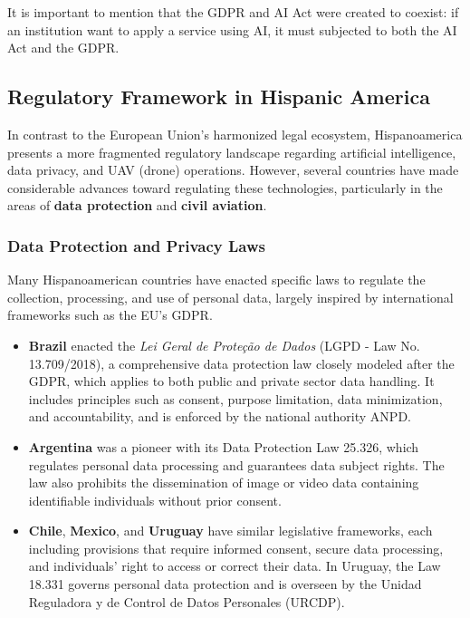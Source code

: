\documentclass[12pt]{report} %
\begin{document}
It is important to mention that the GDPR and AI Act were created to coexist: if an institution want to apply a service using AI, it must subjected to both the AI Act and the GDPR. 

\subsection{Regulatory Framework in Hispanic America}

In contrast to the European Union’s harmonized legal ecosystem, Hispanoamerica presents a more fragmented regulatory landscape regarding artificial intelligence, data privacy, and UAV (drone) operations. However, several countries have made considerable advances toward regulating these technologies, particularly in the areas of \textbf{data protection} and \textbf{civil aviation}.

\subsubsection{Data Protection and Privacy Laws}

Many Hispanoamerican countries have enacted specific laws to regulate the collection, processing, and use of personal data, largely inspired by international frameworks such as the EU's GDPR. 

\begin{itemize}
    \item \textbf{Brazil} enacted the \textit{Lei Geral de Proteção de Dados} (LGPD - Law No. 13.709/2018), a comprehensive data protection law closely modeled after the GDPR, which applies to both public and private sector data handling. It includes principles such as consent, purpose limitation, data minimization, and accountability, and is enforced by the national authority ANPD.
    
    \item \textbf{Argentina} was a pioneer with its Data Protection Law 25.326, which regulates personal data processing and guarantees data subject rights. The law also prohibits the dissemination of image or video data containing identifiable individuals without prior consent.
    
    \item \textbf{Chile}, \textbf{Mexico}, and \textbf{Uruguay} have similar legislative frameworks, each including provisions that require informed consent, secure data processing, and individuals’ right to access or correct their data. In Uruguay, the Law 18.331 governs personal data protection and is overseen by the Unidad Reguladora y de Control de Datos Personales (URCDP).
\end{itemize}
\end{document}
